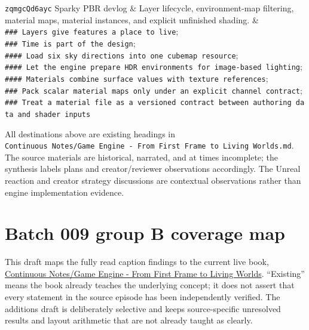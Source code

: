{\begin{longtable}[]
\texttt{zqmgcQd6ayc} Sparky PBR devlog & Layer lifecycle, environment-map filtering, material maps, material instances, and explicit unfinished shading. & \texttt{\#\#\#\ Layers\ give\ features\ a\ place\ to\ live}; \texttt{\#\#\#\ Time\ is\ part\ of\ the\ design}; \texttt{\#\#\#\#\ Load\ six\ sky\ directions\ into\ one\ cubemap\ resource}; \texttt{\#\#\#\#\ Let\ the\ engine\ prepare\ HDR\ environments\ for\ image-based\ lighting}; \texttt{\#\#\#\#\ Materials\ combine\ surface\ values\ with\ texture\ references}; \texttt{\#\#\#\ Pack\ scalar\ material\ maps\ only\ under\ an\ explicit\ channel\ contract}; \texttt{\#\#\#\ Treat\ a\ material\ file\ as\ a\ versioned\ contract\ between\ authoring\ data\ and\ shader\ inputs} \\
\end{longtable}
}

All destinations above are existing headings in \texttt{Continuous\ Notes/Game\ Engine\ -\ From\ First\ Frame\ to\ Living\ Worlds.md}. The source materials are historical, narrated, and at times incomplete; the synthesis labels plans and creator/reviewer observations accordingly. The Unreal reaction and creator strategy discussions are contextual observations rather than engine implementation evidence.

\chapter{Batch 009 group B coverage map}\label{appendix-877738f6f4d2-batch-009-group-b-coverage-map}

This draft maps the fully read caption findings to the current live book, \href{Continuous\%20Notes/Game\%20Engine\%20-\%20From\%20First\%20Frame\%20to\%20Living\%20Worlds}{Continuous Notes/Game Engine - From First Frame to Living Worlds}. ``Existing'' means the book already teaches the underlying concept; it does not assert that every statement in the source episode has been independently verified. The additions draft is deliberately selective and keeps source-specific unresolved results and layout arithmetic that are not already taught as clearly.

